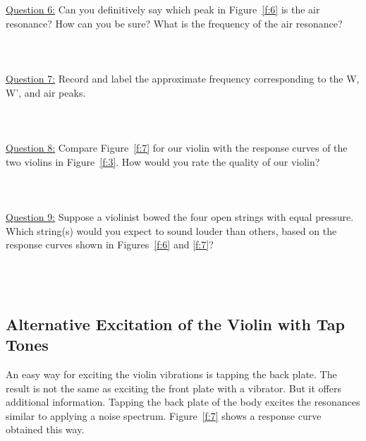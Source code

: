 \documentclass[11pt]{NSF}
\begin{document}
\underline{Question 6:}
Can you definitively say which peak in Figure~\ref{f:6} is the air
resonance? How can you be sure? What is the frequency of the air
resonance?
\\
\\
\\
\\

\underline{Question 7:}
Record and label the approximate frequency corresponding to the W, W', and air peaks. 
\\
\\
\\
\\

\underline{Question 8:}
Compare Figure~\ref{f:7} for our violin with the response curves of the two
violins in Figure~\ref{f:3}. 
How would you rate the quality of our violin?
\\
\\
\\
\\

\underline{Question 9:}
Suppose a violinist bowed the four open strings with equal pressure. 
Which string(s) would you expect to sound louder than others, based on
the response curves shown in Figures~\ref{f:6} and \ref{f:7}?
\\
\\
\\
\\

\subsection{Alternative Excitation of the Violin with Tap Tones}

An easy way for exciting the violin vibrations is tapping the back
plate. The result is not the same as exciting the front plate with a
vibrator. But it offers additional information. Tapping the back plate
of the body excites the resonances similar to applying a noise
spectrum. Figure~\ref{f:7} shows a response curve obtained this way.
\end{document}
